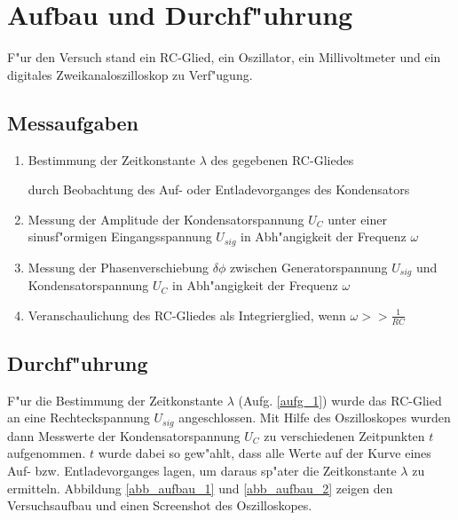 \documentclass{scrartcl}
\begin{document}
	\section{Aufbau und Durchf"uhrung}

		F"ur den Versuch stand ein RC-Glied, ein Oszillator, ein Millivoltmeter und ein digitales Zweikanaloszilloskop zu Verf"ugung.


		\subsection{Messaufgaben}

			\begin{enumerate}
				\item \label{aufg_1} Bestimmung der Zeitkonstante $\lambda$ des gegebenen RC-Gliedes

				durch Beobachtung des Auf- oder Entladevorganges des Kondensators
				\item \label{aufg_2} Messung der Amplitude der Kondensatorspannung $U_C$ unter einer sinusf"ormigen Eingangsspannung $U_{sig}$ in Abh"angigkeit der Frequenz $\omega$

				\item \label{aufg_3} Messung der Phasenverschiebung $\delta \phi$ zwischen Generatorspannung $U_{sig}$ und Kon\-den\-sator\-spannung $U_C$ in Abh"angigkeit der Frequenz $\omega$

				\item \label{aufg_4} Veranschaulichung des RC-Gliedes als Integrierglied, wenn $\omega >> \frac{1}{RC}$

			\end{enumerate}

		\subsection{Durchf"uhrung}

			F"ur die Bestimmung der Zeitkonstante $\lambda$ (Aufg. \ref{aufg_1}) wurde das RC-Glied an eine Rechteck\-spannung $U_{sig}$ angeschlossen.
			Mit Hilfe des Oszilloskopes wurden dann Messwerte der Kondensatorspannung $U_C$ zu verschiedenen Zeitpunkten $t$ aufgenommen.
			$t$ wurde dabei so gew"ahlt, dass alle Werte auf der Kurve eines Auf- bzw. Entladevorganges lagen,
			um daraus sp"ater die Zeitkonstante $\lambda$ zu ermitteln.
			Abbildung \ref{abb_aufbau_1} und \ref{abb_aufbau_2} zeigen den Versuchsaufbau und einen Screenshot des Oszilloskopes.\\
\end{document}
